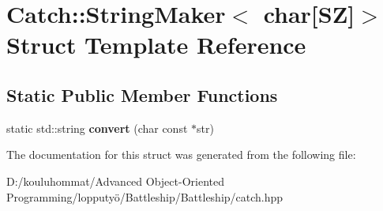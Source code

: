 \hypertarget{struct_catch_1_1_string_maker_3_01char[_s_z]_4}{}\section{Catch\+:\+:String\+Maker$<$ char\mbox{[}SZ\mbox{]}$>$ Struct Template Reference}
\label{struct_catch_1_1_string_maker_3_01char[_s_z]_4}
\subsection*{Static Public Member Functions}
\begin{DoxyCompactItemize}
\item 
\mbox{\label{struct_catch_1_1_string_maker_3_01char[_s_z]_4_a095e415534f9145300271befe9853357}} 
static std\+::string {\bfseries convert} (char const $\ast$str)
\end{DoxyCompactItemize}


The documentation for this struct was generated from the following file\+:\begin{DoxyCompactItemize}
\item 
D\+:/kouluhommat/\+Advanced Object-\/\+Oriented Programming/lopputyö/\+Battleship/\+Battleship/catch.\+hpp\end{DoxyCompactItemize}
